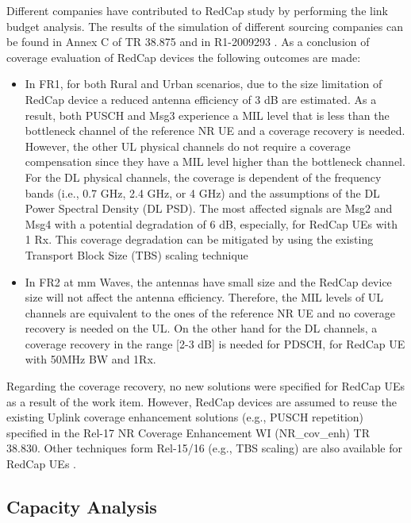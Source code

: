 \documentclass[conference]{IEEEtran}
\begin{document}
Different companies have contributed to RedCap study by performing the link budget analysis. The results of the simulation of different sourcing companies can be found in Annex C of TR 38.875 \cite{3gpp_study_2021_38.875} and in R1-2009293 \cite{3gpp_fl_2022_R1-2009293}. As a conclusion of coverage evaluation of RedCap devices the following outcomes are made:
\begin{itemize}
    \item In FR1, for both Rural and Urban scenarios, due to the size limitation of RedCap device a reduced antenna efficiency of 3 dB are estimated. As a result, both PUSCH and Msg3 experience a MIL level that is less than the bottleneck channel of the reference NR UE and a coverage recovery is needed. However, the other UL physical channels do not require a coverage compensation since they have a MIL level higher than the bottleneck channel. For the DL physical channels, the coverage is dependent of the frequency bands (i.e., 0.7 GHz, 2.4 GHz, or 4 GHz) and the assumptions of the DL Power Spectral Density (DL PSD). The most affected signals are Msg2 and Msg4 with a potential degradation of 6 dB, especially, for RedCap UEs with 1 Rx. This coverage degradation can be mitigated by using the existing  Transport Block Size (TBS) scaling technique
    \item In FR2 at mm Waves, the antennas have small size and the RedCap device size will not affect the antenna efficiency. Therefore, the MIL levels of UL channels are equivalent to the ones of the reference NR UE and no coverage recovery is needed on the UL. On the other hand for the DL channels, a coverage recovery in the range [2-3 dB] is needed for PDSCH, for RedCap UE with 50MHz BW and 1Rx.
\end{itemize}


Regarding the coverage recovery, no new solutions were specified for RedCap UEs as a result of the work item.  However, RedCap devices are assumed to reuse the existing Uplink coverage enhancement solutions (e.g., PUSCH repetition)  specified in the Rel-17 NR Coverage Enhancement WI (NR\_cov\_enh) TR 38.830\cite{3gpp_study_nodate-3_38.830}. Other techniques form Rel-15/16 (e.g., TBS scaling) are also available for RedCap UEs .






\subsection{Capacity Analysis}
\label{sec:6-2}
\end{document}
